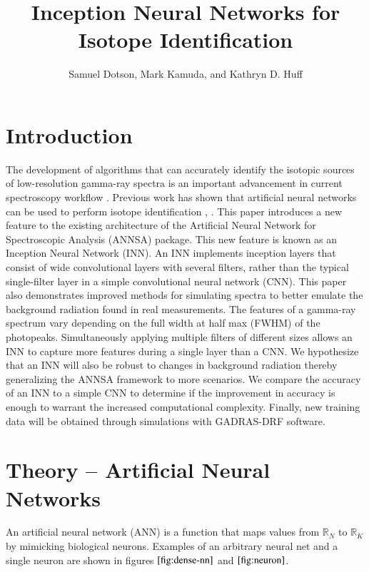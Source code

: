 \documentclass{anstrans}
\title{Inception Neural Networks for Isotope Identification}
\author{Samuel Dotson, Mark Kamuda, and Kathryn D. Huff}
\institute{
Dept. of Nuclear, Plasma and Radiological Engineering, University of Illinois at Urbana-Champaign \\
sgd2@illinois.edu
}
\begin{document}

\section{Introduction}
The development of algorithms that can accurately identify the isotopic sources of low-resolution gamma-ray 
spectra is an important advancement in  current spectroscopy workflow \cite{rawool-sullivanStepsAutomatedGamma2010}.
Previous work has shown that artificial neural networks can be used to perform isotope identification \cite{kamudaAutomatedIsotopeIdentification2017} \cite{kamudaComparisonMachineLearning2018a}, \cite{kamudaMachineLearningApproach2018}. This paper introduces a new feature to the existing architecture of the Artificial Neural Network for Spectroscopic Analysis (ANNSA) package. This new feature is known as an Inception Neural Network (INN). An INN implements inception layers that consist of wide convolutional layers with several filters, rather than the typical single-filter layer in a simple convolutional neural network (CNN).
This paper also demonstrates improved methods for simulating spectra to better emulate the background radiation found in real measurements. 
The features of a gamma-ray spectrum vary depending on the full width at half max (FWHM) of the photopeaks. 
Simultaneously applying multiple filters of different sizes allows an INN to capture more features during a single layer than a CNN. 
We hypothesize that an INN will also be robust to changes in background radiation thereby generalizing the ANNSA framework to more scenarios. 
We compare the accuracy of an INN to a simple CNN to determine if the improvement in accuracy is enough to warrant the increased computational complexity. 
Finally, new training data will be obtained through simulations with GADRAS-DRF \cite{mitchellGADRASIsotopeID2014} software.

\section{Theory -- Artificial Neural Networks}

An artificial neural network (ANN) is a function that maps values from ${\mathbb{R}}_{N}$ to ${\mathbb{R}}_{K}$ by mimicking biological 
neurons. Examples of an arbitrary neural net and a single neuron are shown in figures $\ref{fig:dense-nn}$ and $\ref{fig:neuron}$. 
\end{document}
